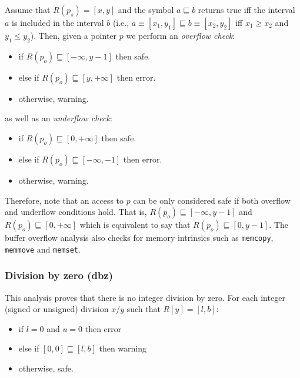 \documentclass[a4]{article}
\begin{document}
\noindent Assume that $R(p_{s}) = [x,y]$ and the symbol $a \sqsubseteq
b$ returns true iff the interval $a$ is included in the interval $b$
(i.e., $ a \equiv [x_1,y_1] \sqsubseteq b \equiv [x_2,y_2]$ iff $x_1 \geq x_2$ and $y_1
\leq y_2$). Then, given a pointer $p$ we perform an \emph{overflow
  check}:

\begin{itemize}
\item if $R(p_{o}) \sqsubseteq [-\infty, y -1]$  then safe.
\item else if $R(p_{o}) \sqsubseteq [y, +\infty]$ then error.
\item otherwise, warning.
\end{itemize}

\noindent as well as an \emph{underflow check}:

\begin{itemize}

\item if $R(p_{o}) \sqsubseteq [0, +\infty]$ then safe.
\item else if $R(p_{o}) \sqsubseteq [-\infty, -1]$ then error.
\item otherwise, warning.
\end{itemize}

\noindent Therefore, note that an access to $p$ can be only considered
safe if both overflow and underflow conditions hold. That is,
$R(p_{o}) \sqsubseteq [-\infty, y -1]$ and $R(p_{o}) \sqsubseteq [0,
  +\infty]$ which is equivalent to say that $R(p_{o}) \sqsubseteq [0,
  y -1]$. The buffer overflow analysis also checks for memory
intrinsics such as \texttt{memcopy}, \texttt{memmove} and
\texttt{memset}.


\subsubsection{Division by zero (\textsf{dbz})}

This analysis proves that there is no integer division by zero. For
each integer (signed or unsigned) division $x / y$ such that $R[y] =
[l,b]$:

\begin{itemize}
\item if $l=0$ and $u=0$ then error
\item else if $[0,0] \sqsubseteq [l,b]$ then warning
\item otherwise, safe.
\end{itemize}
\end{document}
